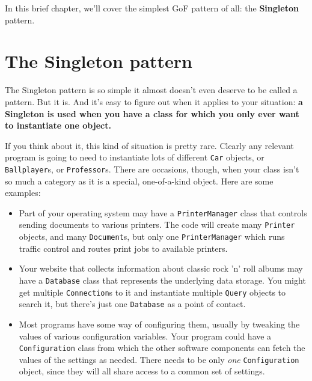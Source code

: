 In this brief chapter, we'll cover the simplest GoF pattern of all:
the \textbf{Singleton} pattern.

\section{The Singleton pattern}

The Singleton pattern is so simple it almost doesn't even deserve to be called
a pattern. But it is. And it's easy to figure out when it applies to your
situation: \textbf{a Singleton is used when you have a class for which you
only ever want to instantiate one object.}

If you think about it, this kind of situation is pretty rare. Clearly any
relevant program is going to need to instantiate lots of different
\texttt{Car} objects, or \texttt{Ballplayer}s, or \texttt{Professor}s. There
are occasions, though, when your class isn't so much a category as it is a
special, one-of-a-kind object. Here are some examples:

\begin{itemize}
\itemsep.1em

\item Part of your operating system may have a \texttt{PrinterManager} class
that controls sending documents to various printers. The code will create many 
\texttt{Printer} objects, and many \texttt{Document}s, but only one
\texttt{PrinterManager} which runs traffic control and routes print jobs to
available printers.

\item Your website that collects information about classic rock 'n' roll
albums may have a \texttt{Database} class that represents the underlying data
storage. You might get multiple \texttt{Connection}s to it and instantiate
multiple \texttt{Query} objects to search it, but there's just one
\texttt{Database} as a point of contact.

\item Most programs have some way of configuring them, usually by tweaking the
values of various configuration variables. Your program could have a
\texttt{Config\-uration} class from which the other software components can
fetch the values of the settings as needed. There needs to be only
\textit{one} \texttt{Configuration} object, since they will all share access
to a common set of settings.

\end{itemize}

